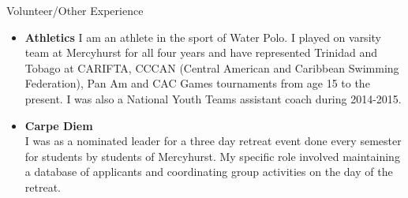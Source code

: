 \documentclass[11pt]{resume} %
\newcommand{\bold}[1]{\textbf{#1}}
\begin{document}
\begin{rSection}{Volunteer/Other Experience}
	\begin{itemize}
		\item\bold{Athletics}
		I am an athlete in the sport of Water Polo. I played on varsity team at Mercyhurst for all four years and have represented Trinidad and Tobago at CARIFTA, CCCAN (Central American and Caribbean Swimming Federation), Pan Am and CAC Games tournaments from age 15 to the present. I was also a National Youth Teams assistant coach during 2014-2015. 
		\item\bold{Carpe Diem}\\
		I was as a nominated leader for a three day retreat event done every semester for students by students of Mercyhurst. My specific role involved maintaining a database of applicants and coordinating group activities on the day of the retreat. 
	\end{itemize}
\end{rSection}
\end{document}
